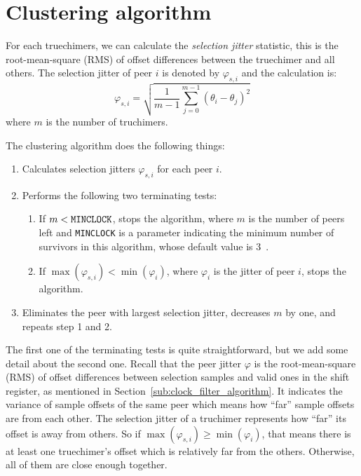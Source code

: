 \section{Clustering algorithm}%
\label{sec:clustering_algorithm}
For each truechimers, we can calculate the \emph{selection jitter} statistic,
this is the root-mean-square (RMS) of offset differences between the truechimer
and all others. The selection jitter of peer $i$ is denoted by $\varphi_{s,i}$
and the calculation is:
\begin{equation}
    \varphi_{s,i} = \sqrt{\frac{1}{m-1} \sum^{m-1}_{j=0} (\theta_i -
    \theta_j)^2 }
    \label{eq:selection_jitter}
\end{equation}
where $m$ is the number of truchimers.

The clustering algorithm does the following things:
\begin{enumerate}
    \item Calculates selection jitters $\varphi_{s, i}$ for each peer $i$.
    \item Performs the following two terminating tests:
        \begin{enumerate}
            \item If $m < \verb|MINCLOCK|$, stops the algorithm, where $m$ is
                the number of peers left and \verb|MINCLOCK| is a parameter
                indicating the minimum number of survivors in this algorithm,
                whose default value is 3~\cite{rfc5905}.
            \item If $\max(\varphi_{s,i}) < \min(\varphi_i)$, where
                $\varphi_i$ is the jitter of peer $i$, stops the
                algorithm.
        \end{enumerate}
    \item Eliminates the peer with largest selection jitter, decreases $m$
        by one, and repeats step 1 and 2.
\end{enumerate}
The first one of the terminating tests is quite straightforward, but we add some
detail about the second one. Recall that the peer jitter $\varphi$ is the
root-mean-square (RMS) of offset differences between selection samples and
valid ones in the shift register, as mentioned in
Section~\ref{sub:clock_filter_algorithm}. It indicates the variance of sample
offsets of the same peer which means how ``far'' sample offsets are from each
other.
The selection jitter of a truchimer represents how ``far'' its offset is away from
others.  So if $\max(\varphi_{s,i}) \ge \min(\varphi_i)$, that means there is at
least one truechimer's offset which is relatively far from the others. Otherwise,
all of them are close enough together.

